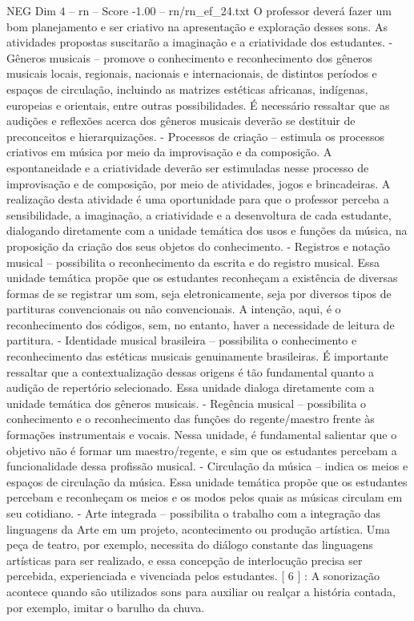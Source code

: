 \begin{textsample}{NEG Dim 4 – rn – Score -1.00 – rn/rn\_ef\_24.txt}
O professor deverá fazer um bom planejamento e ser criativo na apresentação e exploração desses sons.
As atividades propostas suscitarão a imaginação e a criatividade dos estudantes. - Gêneros musicais – promove o conhecimento e reconhecimento dos gêneros musicais locais, regionais, nacionais e internacionais, de distintos períodos e espaços de circulação, incluindo as matrizes estéticas africanas, indígenas, europeias e orientais, entre outras possibilidades.
É necessário ressaltar que as audições e reflexões acerca dos gêneros musicais deverão se destituir de preconceitos e hierarquizações. - Processos de criação – estimula os processos criativos em música por meio da improvisação e da composição.
A espontaneidade e a criatividade deverão ser estimuladas nesse processo de improvisação e de composição, por meio de atividades, jogos e brincadeiras.
A realização desta atividade é uma oportunidade para que o professor perceba a sensibilidade, a imaginação, a criatividade e a desenvoltura de cada estudante, dialogando diretamente com a unidade temática dos usos e funções da música, na proposição da criação dos seus objetos do conhecimento. - Registros e notação musical – possibilita o reconhecimento da escrita e do registro musical.
Essa unidade temática propõe que os estudantes reconheçam a existência de diversas formas de se registrar um som, seja eletronicamente, seja por diversos tipos de partituras convencionais ou não convencionais.
A intenção, aqui, é o reconhecimento dos códigos, sem, no entanto, haver a necessidade de leitura de partitura. - Identidade musical brasileira – possibilita o conhecimento e reconhecimento das estéticas musicais genuinamente brasileiras.
É importante ressaltar que a contextualização dessas origens é tão fundamental quanto a audição de repertório selecionado.
Essa unidade dialoga diretamente com a unidade temática dos gêneros musicais. - Regência musical – possibilita o conhecimento e o reconhecimento das funções do regente/maestro frente às formações instrumentais e vocais.
Nessa unidade, é fundamental salientar que o objetivo não é formar um maestro/regente, e sim que os estudantes percebam a funcionalidade dessa profissão musical. - Circulação da música – indica os meios e espaços de circulação da música.
Essa unidade temática propõe que os estudantes percebam e reconheçam os meios e os modos pelos quais as músicas circulam em seu cotidiano. - Arte integrada – possibilita o trabalho com a integração das linguagens da Arte em um projeto, acontecimento ou produção artística.
Uma peça de teatro, por exemplo, necessita do diálogo constante das linguagens artísticas para ser realizado, e essa concepção de interlocução precisa ser percebida, experienciada e vivenciada pelos estudantes. [ 6 ] : A sonorização acontece quando são utilizados sons para auxiliar ou realçar a história contada, por exemplo, imitar o barulho da chuva.

\end{textsample}
